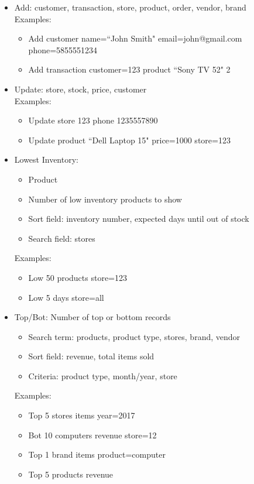 \documentclass[12pt]{article}
\begin{document}
    \begin{itemize}
      \item
        Add: customer, transaction, store, product, order, vendor, brand\\
        Examples:
        \begin{itemize}
          \item Add customer name=``John Smith" email=john@gmail.com phone=5855551234
          \item Add transaction customer=123 product ``Sony TV 52" 2
        \end{itemize}

      \item
        Update: store, stock, price, customer\\
        Examples:
        \begin{itemize}
          \item Update store 123 phone 1235557890
          \item Update product ``Dell Laptop 15" price=1000 store=123
        \end{itemize}

        \pagebreak

      \item 
        Lowest Inventory:
        \begin{itemize}
          \item Product
          \item Number of low inventory products to show
          \item Sort field: inventory number, expected days until out of stock
          \item Search field: stores
        \end{itemize}
        Examples:
        \begin{itemize}
          \item Low 50 products store=123
          \item Low 5 days store=all
        \end{itemize}

      \item
        Top/Bot: Number of top or bottom records
        \begin{itemize}
          \item Search term: products, product type, stores, brand, vendor
          \item Sort field: revenue, total items sold
          \item Criteria: product type, month/year, store
        \end{itemize}
        Examples:
        \begin{itemize}
          \item Top 5 stores items year=2017
          \item Bot 10 computers revenue store=12
          \item Top 1 brand items product=computer
          \item Top 5 products revenue
        \end{itemize}


\end{itemize}
\end{document}
